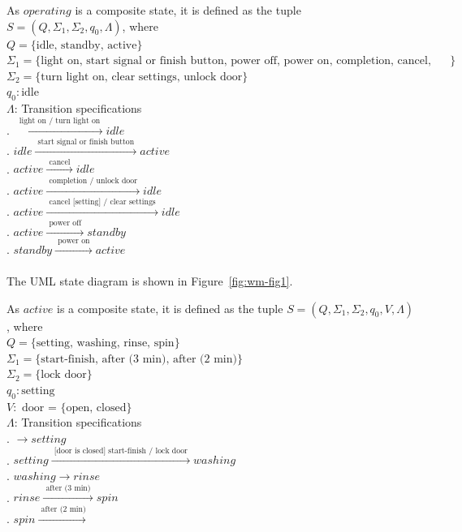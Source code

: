 \documentclass[12pt]{article}
\begin{document}
\begin{spacing}{1.5}
\noindent As $operating$ is a composite state, it is defined as the tuple $S = (Q, \Sigma_1, \Sigma_2, q_0, \Lambda)$, where\\
\noindent $Q = \{\text {idle, standby, active}\}$\\
\noindent $\Sigma_1 = \{\text {light on, start signal or finish button, power off, power on, completion, cancel, cancel [setting]}\}$\\ 
\noindent $\Sigma_2 = \{\text {turn light on, clear settings, unlock door}\}$\\
\noindent $q_0: \text{idle}$\\
\noindent $\Lambda$: Transition specifications\\
. $\xrightarrow {\text { light on / turn light on }} idle$\\
. $idle \xrightarrow {\text { start signal or finish button }} active$\\
. $active \xrightarrow {\text { cancel }} idle$\\
. $active \xrightarrow {\text { completion / unlock door }} idle$\\
. $active \xrightarrow {\text { cancel [setting] / clear settings }} idle$\\
. $active \xrightarrow {\text { power off }} standby$\\
. $standby \xrightarrow {\text { power on }} active$\\\\
\noindent The UML state diagram is shown in Figure~\ref{fig:wm-fig1}.\\
\newpage

\noindent As $active$ is a composite state, it is defined as the tuple $S = (Q, \Sigma_1, \Sigma_2, q_0, V, \Lambda)$, where\\
\noindent $Q = \{\text {setting, washing, rinse, spin}\}$\\
\noindent $\Sigma_1 = \{\text {start-finish, after (3 min), after (2 min)}\}$\\ 
\noindent $\Sigma_2 = \{\text {lock door}\}$\\
\noindent $q_0: \text{setting}$\\
\noindent $V: \text{ door = \{open, closed\} }$\\
\noindent $\Lambda$: Transition specifications\\
. $\xrightarrow {} setting$\\
. $setting \xrightarrow {\text { [door is closed] start-finish / lock door }} washing $\\
. $washing \xrightarrow {} rinse$\\
. $rinse \xrightarrow {\text { after (3 min) }} spin$\\
. $spin  \xrightarrow {\text { after (2 min)}}$\\


\end{spacing}
\end{document}
